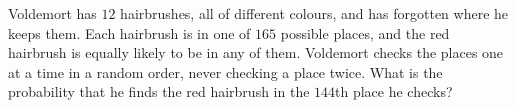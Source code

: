 Voldemort has $12$ hairbrushes, all of different colours, and has forgotten where he keeps them. Each hairbrush is in one of $165$ possible places, and the red hairbrush is equally likely to be in any of them. Voldemort checks the places one at a time in a random order, never checking a place twice. What is the probability that he finds the red hairbrush in the $144$th place he checks?
